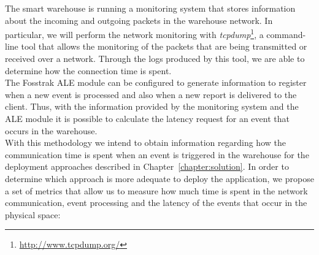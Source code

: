 The smart warehouse is running a monitoring system that stores information about the incoming and outgoing
packets in the warehouse network. In particular, we will perform the network monitoring with
\textit{tcpdump}\footnote{\url{http://www.tcpdump.org/}}, a command-line tool that allows the monitoring
of the packets that are being transmitted or received over a network. Through the logs produced by this tool,
we are able to determine how the connection time is spent.\\

The Fosstrak \gls{ALE} module can be configured to generate information to register when a new event
is processed and also when a new report is delivered to the client. Thus, with the information provided
by the monitoring system and the \gls{ALE} module it is possible to calculate the latency request for
an event that occurs in the warehouse.\\

With this methodology we intend to obtain information regarding how the communication time is spent
when an event is triggered in the warehouse for the deployment approaches described in Chapter~\ref{chapter:solution}.
In order to determine which approach is more adequate to deploy the application, we propose a set of
metrics that allow us to measure how much time is spent in the network communication, event processing
and the latency of the events that occur in the physical space:

